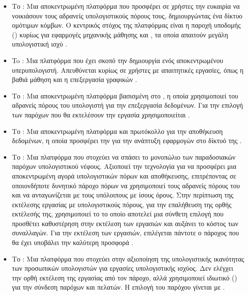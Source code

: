 \begin{itemize}
    \item Το : Μια αποκεντρωμένη πλατφόρμα που προσφέρει σε χρήστες την ευκαιρία να νοικιάσουν τους αδρανείς υπολογιστικούς πόρους τους, δημιουργώντας ένα δίκτυο ομότιμων κόμβων. Ο κεντρικός στόχος της πλατφόρμας είναι η παροχή υποδομής () κυρίως για εφαρμογές μηχανικής μάθησης και , τα οποία απαιτούν μεγάλη υπολογιστική ισχύ \cite{ref31}.
    \item To : Μια πλατφόρμα που έχει σκοπό την δημιουργία ενός αποκεντρωμένου υπερυπολογιστή. Απευθύνεται κυρίως σε χρήστες με απαιτητικές εργασίες, όπως η βαθιά μάθηση και η επεξεργασία γραφικών \cite{ref32}.
    \item Το : Μια αποκεντρωμένη πλατφόρμα βασισμένη στο , η οποία χρησιμοποιεί του αδρανείς πόρους του υπολογιστή για την επεξεργασία δεδομένων. Για την επιλογή των παρόχων που θα εκτελέσουν την εργασία χρησιμοποιείται  \cite{ref33}.
    \item Το : Μια αποκεντρωμένη πλατφόρμα και πρωτόκολλο για την αποθήκευση δεδομένων, η οποία προσφέρει την  για την ανάπτυξη εφαρμογών στο δίκτυό της \cite{ref34}.
    \item Το : Μια πλατφόρμα που στοχεύει να σπάσει 
    το μονοπώλιο των παραδοσιακών παρόχων υπολογιστικού νέφους. Αξιοποιεί 
    την τεχνολογία  για να προσφέρει μια αποκεντρωμένη αγορά 
    υπολογιστικών πόρων και αποθήκευσης, επιτρέποντας σε οποιονδήποτε δυνητικό 
    πάροχο πόρων να χρησιμοποιεί τους αδρανείς πόρους του και να ανταγωνίζεται με 
    τους υπόλοιπους με ίσους όρους. Στην περίπτωση της εκτέλεσης εργασίας με 
    υπολογιστικούς πόρους, για την επαλήθευση της ορθής εκτέλεσής της, 
    χρησιμοποιεί το  \cite{ref35} το οποίο αποτελεί μια σύνθετη επιλογή που προσθέτει καθυστέρηση στην εκτέλεση των εργασιών και αυξάνει το κόστος των συναλλαγών. Για την εκτέλεση των εργασιών, επιλέγεται πάντοτε ο πάροχος που θα έχει υποβάλει την καλύτερη προσφορά \cite{ref36,ref37}.
    \item Το : Μια πλατφόρμα που στοχεύει στην αξιοποίηση της υπολογιστικής ικανότητας 
    των προσωπικών υπολογιστών για εργασίες υπολογιστικής ισχύος. Δεν ελέγχει την ορθή εκτέλεση της εργασίας από τον πάροχο, αλλά χρησιμοποιεί ιδιωτικό ()  για την σύνδεση παρόχων και πελατών. Η επιλογή του παρόχου γίνεται με  \cite{ref38,ref39}.
\end{itemize}

